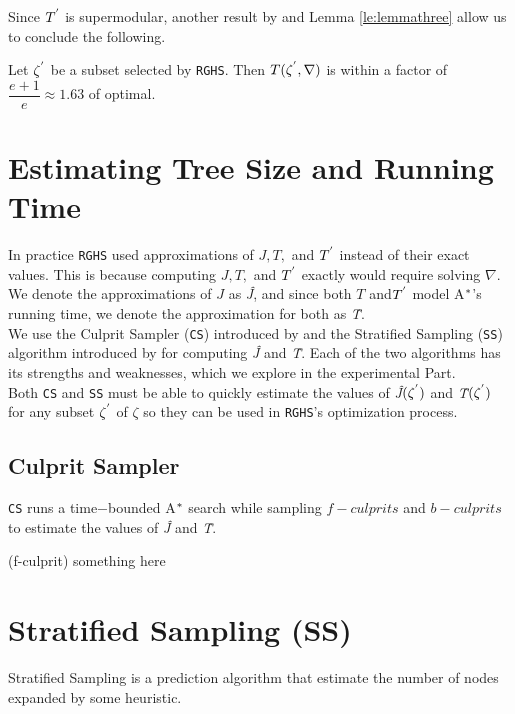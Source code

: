 Since $T\sp{'}$ is supermodular, another result by \cite{buchbinder2014submodular} and Lemma \ref{le:lemmathree} allow us to conclude the following.


\begin{theorem}
Let $\zeta\sp{'}$ be a subset selected by \texttt{RGHS}. Then $T(\zeta\sp{'}, \nabla)$ is within a factor of $\dfrac{e+1}{e} \approx 1.63$ of optimal.
\label{th:theorem_three}
\end{theorem}

\section{Estimating Tree Size and Running Time}
In  practice \texttt{RGHS} used approximations of $J,T,$ and $T\sp{'}$ instead of their exact values. This is because computing $J,T,$ and $T\sp{'}$ exactly would require solving $\nabla$. We denote the approximations of $J$ as \textit{\^{J}}, and since both $T$ and$T\sp{'}$ model A$\sp{*}$'s running time, we denote the approximation for both as \textit{\^{T}}.\\

We use the Culprit Sampler (\texttt{CS}) introduced by \cite{BarleySantiagoOver} and the Stratified Sampling (\texttt{SS}) algorithm introduced by \cite{chen1992heuristic} for computing \textit{\^{J}} and \textit{\^{T}}. Each of the two algorithms has its strengths and weaknesses, which we explore in the experimental Part.\\

Both \texttt{CS} and \texttt{SS} must be able to quickly estimate the values of \textit{\^{J}}$(\zeta\sp{'})$ and \textit{\^{T}}$(\zeta\sp{'})$ for any subset $\zeta\sp{'}$ of $\zeta$ so they can be used in \texttt{RGHS}'s optimization process.

\subsection{Culprit Sampler}
\noindent
\texttt{CS} runs a time$-$bounded A$\sp{*}$ search while sampling $f-culprits$ and $b-culprits$ to estimate the values of \textit{\^{J}} and \textit{\^{T}}.

\begin{definition}(f-culprit)
something here
\label{def:def_one}
\end{definition}



\section{Stratified Sampling (SS)}
Stratified Sampling is a prediction algorithm that estimate the number of nodes expanded by some heuristic.\\

